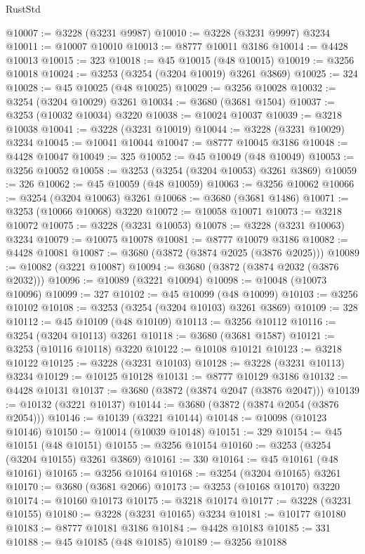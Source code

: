 \begin{lexlean}{RustStd}
\begin{coremodule}
{\begin{coremodule}
{{{{{{{{{{{{{{{{{{{{{{{{{{{{{{{{{{{{{@10007 := @3228 (@3231 @9987)
@10010 := @3228 (@3231 @9997) @3234
@10011 := @10007 @10010
@10013 := @8777 @10011 @3186
@10014 := @4428 @10013
@10015 := 323
@10018 := @45 @10015 (@48 @10015)
@10019 := @3256 @10018
@10024 := @3253 (@3254 (@3204 @10019) @3261 @3869)
@10025 := 324
@10028 := @45 @10025 (@48 @10025)
@10029 := @3256 @10028
@10032 := @3254 (@3204 @10029) @3261
@10034 := @3680 (@3681 @1504)
@10037 := @3253 (@10032 @10034) @3220
@10038 := @10024 @10037
@10039 := @3218 @10038
@10041 := @3228 (@3231 @10019)
@10044 := @3228 (@3231 @10029) @3234
@10045 := @10041 @10044
@10047 := @8777 @10045 @3186
@10048 := @4428 @10047
@10049 := 325
@10052 := @45 @10049 (@48 @10049)
@10053 := @3256 @10052
@10058 := @3253 (@3254 (@3204 @10053) @3261 @3869)
@10059 := 326
@10062 := @45 @10059 (@48 @10059)
@10063 := @3256 @10062
@10066 := @3254 (@3204 @10063) @3261
@10068 := @3680 (@3681 @1486)
@10071 := @3253 (@10066 @10068) @3220
@10072 := @10058 @10071
@10073 := @3218 @10072
@10075 := @3228 (@3231 @10053)
@10078 := @3228 (@3231 @10063) @3234
@10079 := @10075 @10078
@10081 := @8777 @10079 @3186
@10082 := @4428 @10081
@10087 := @3680 (@3872 (@3874 @2025 (@3876 @2025)))
@10089 := @10082 (@3221 @10087)
@10094 := @3680 (@3872 (@3874 @2032 (@3876 @2032)))
@10096 := @10089 (@3221 @10094)
@10098 := @10048 (@10073 @10096)
@10099 := 327
@10102 := @45 @10099 (@48 @10099)
@10103 := @3256 @10102
@10108 := @3253 (@3254 (@3204 @10103) @3261 @3869)
@10109 := 328
@10112 := @45 @10109 (@48 @10109)
@10113 := @3256 @10112
@10116 := @3254 (@3204 @10113) @3261
@10118 := @3680 (@3681 @1587)
@10121 := @3253 (@10116 @10118) @3220
@10122 := @10108 @10121
@10123 := @3218 @10122
@10125 := @3228 (@3231 @10103)
@10128 := @3228 (@3231 @10113) @3234
@10129 := @10125 @10128
@10131 := @8777 @10129 @3186
@10132 := @4428 @10131
@10137 := @3680 (@3872 (@3874 @2047 (@3876 @2047)))
@10139 := @10132 (@3221 @10137)
@10144 := @3680 (@3872 (@3874 @2054 (@3876 @2054)))
@10146 := @10139 (@3221 @10144)
@10148 := @10098 (@10123 @10146)
@10150 := @10014 (@10039 @10148)
@10151 := 329
@10154 := @45 @10151 (@48 @10151)
@10155 := @3256 @10154
@10160 := @3253 (@3254 (@3204 @10155) @3261 @3869)
@10161 := 330
@10164 := @45 @10161 (@48 @10161)
@10165 := @3256 @10164
@10168 := @3254 (@3204 @10165) @3261
@10170 := @3680 (@3681 @2066)
@10173 := @3253 (@10168 @10170) @3220
@10174 := @10160 @10173
@10175 := @3218 @10174
@10177 := @3228 (@3231 @10155)
@10180 := @3228 (@3231 @10165) @3234
@10181 := @10177 @10180
@10183 := @8777 @10181 @3186
@10184 := @4428 @10183
@10185 := 331
@10188 := @45 @10185 (@48 @10185)
@10189 := @3256 @10188
}}}}}}}}}}}}}}}}}}}}}}}}}}}}}}}}}}}}}
\end{coremodule}}
\end{coremodule}
\end{lexlean}
